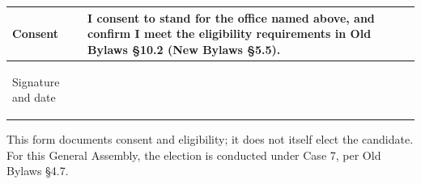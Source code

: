 \documentclass{../../../Common/Latex/Templates/rapport}
\begin{document}
\begin{tabularx}{\textwidth}{|>{\bfseries\raggedright\arraybackslash}p{4.2cm}|X|}
  \hline
  Consent                                & \rule{0pt}{1.6cm}I consent to stand for the office named above, and confirm I meet the eligibility requirements in Old Bylaws \S10.2 (New Bylaws \S5.5).                                                                                                                                                                                                                                    \\
  \hline
  Signature and date                     & \rule{0pt}{1.4cm}                                                                                                                                                                                                                                                                                                                                                                           \\
  \hline
\end{tabularx}

\vfill
This form documents consent and eligibility; it does not itself elect the candidate. For this General Assembly, the election is conducted under Case 7, per Old Bylaws \S4.7.
\end{document}
